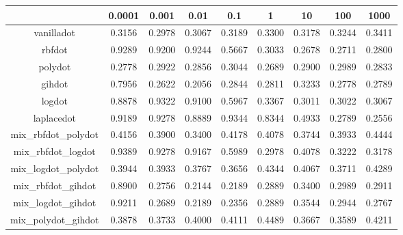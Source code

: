 \begin{table}[ht]
\centering
\begin{tabular}{ccccccccc}
  \hline
 & 0.0001 & 0.001 & 0.01 & 0.1 & 1 & 10 & 100 & 1000 \\ 
  \hline
vanilladot & 0.3156 & 0.2978 & 0.3067 & 0.3189 & 0.3300 & 0.3178 & 0.3244 & 0.3411 \\ 
  rbfdot & 0.9289 & 0.9200 & 0.9244 & 0.5667 & 0.3033 & 0.2678 & 0.2711 & 0.2800 \\ 
  polydot & 0.2778 & 0.2922 & 0.2856 & 0.3044 & 0.2689 & 0.2900 & 0.2989 & 0.2833 \\ 
  gihdot & 0.7956 & 0.2622 & 0.2056 & 0.2844 & 0.2811 & 0.3233 & 0.2778 & 0.2789 \\ 
  logdot & 0.8878 & 0.9322 & 0.9100 & 0.5967 & 0.3367 & 0.3011 & 0.3022 & 0.3067 \\ 
  laplacedot & 0.9189 & 0.9278 & 0.8889 & 0.9344 & 0.8344 & 0.4933 & 0.2789 & 0.2556 \\ 
  mix\_rbfdot\_polydot & 0.4156 & 0.3900 & 0.3400 & 0.4178 & 0.4078 & 0.3744 & 0.3933 & 0.4444 \\ 
  mix\_rbfdot\_logdot & 0.9389 & 0.9278 & 0.9167 & 0.5989 & 0.2978 & 0.4078 & 0.3222 & 0.3178 \\ 
  mix\_logdot\_polydot & 0.3944 & 0.3933 & 0.3767 & 0.3656 & 0.4344 & 0.4067 & 0.3711 & 0.4289 \\ 
  mix\_rbfdot\_gihdot & 0.8900 & 0.2756 & 0.2144 & 0.2189 & 0.2889 & 0.3400 & 0.2989 & 0.2911 \\ 
  mix\_logdot\_gihdot & 0.9211 & 0.2689 & 0.2189 & 0.2356 & 0.2889 & 0.3544 & 0.2944 & 0.2767 \\ 
  mix\_polydot\_gihdot & 0.3878 & 0.3733 & 0.4000 & 0.4111 & 0.4489 & 0.3667 & 0.3589 & 0.4211 \\ 
   \hline
\end{tabular}
\end{table}
